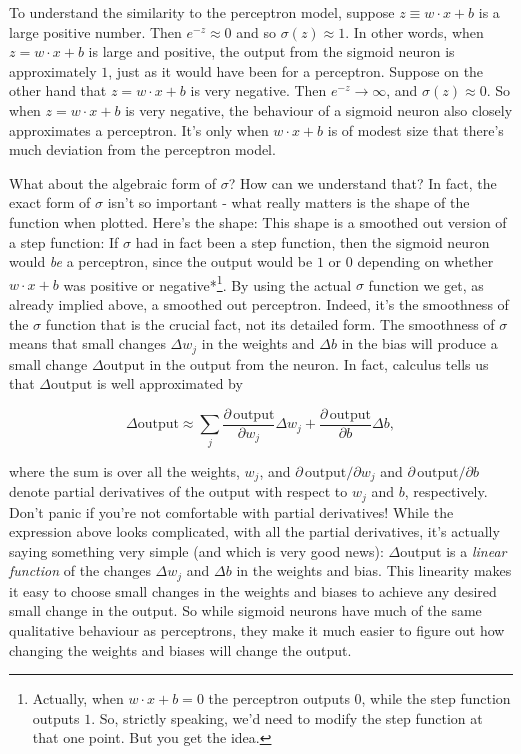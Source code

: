 To understand the similarity to the perceptron model, suppose $z \equiv w \cdot x + b$ is a large positive number. Then $e^{-z} \approx 0$ and so $\sigma(z) \approx 1$. In other words, when $z = w \cdot x+b$ is large and positive, the output from the sigmoid neuron is approximately $1$, just as it would have been for a perceptron. Suppose on the other hand that $z = w \cdot x+b$ is very negative. Then $e^{-z} \rightarrow \infty$, and $\sigma(z) \approx 0$. So when $z = w \cdot x +b$ is very negative, the behaviour of a sigmoid neuron also closely approximates a perceptron. It's only when $w \cdot x+b$ is of modest size that there's much deviation from the perceptron model.


What about the algebraic form of $\sigma$? How can we understand that? In fact, the exact form of $\sigma$ isn't so important - what really matters is the shape of the function when plotted. Here's the shape: This shape is a smoothed out version of a step function: If $\sigma$ had in fact been a step function, then the sigmoid neuron would \emph{be} a perceptron, since the output would be $1$ or $0$ depending on whether $w\cdot x+b$ was positive or negative*\footnote{Actually, when $w \cdot x +b = 0$ the perceptron outputs $0$, while the step function outputs $1$. So, strictly speaking, we'd need to modify the step function at that one point. But you get the idea.}. By using the actual $\sigma$ function we get, as already implied above, a smoothed out perceptron. Indeed, it's the smoothness of the $\sigma$ function that is the crucial fact, not its detailed form. The smoothness of $\sigma$ means that small changes $\Delta w_j$ in the weights and $\Delta b$ in the bias will produce a small change $\Delta \mbox{output}$ in the output from the neuron. In fact, calculus tells us that $\Delta \mbox{output}$ is well approximated by

\begin{equation}
\Delta \mbox{output} \approx \sum_j \frac{\partial \, \mbox{output}}{\partial w_j} \Delta w_j + \frac{\partial \, \mbox{output}}{\partial b} \Delta b,
\tag{5}
\end{equation}

\noindent where the sum is over all the weights, $w_j$, and $\partial \, \mbox{output} / \partial w_j$ and $\partial \, \mbox{output} /\partial b$ denote partial derivatives of the $\mbox{output}$ with respect to $w_j$ and $b$, respectively. Don't panic if you're not comfortable with partial derivatives! While the expression above looks complicated, with all the partial derivatives, it's actually saying something very simple (and which is very good news): $\Delta \mbox{output}$ is a \emph{linear function} of the changes $\Delta w_j$ and $\Delta b$ in the weights and bias. This linearity makes it easy to choose small changes in the weights and biases to achieve any desired small change in the output. So while sigmoid neurons have much of the same qualitative behaviour as perceptrons, they make it much easier to figure out how changing the weights and biases will change the output.


